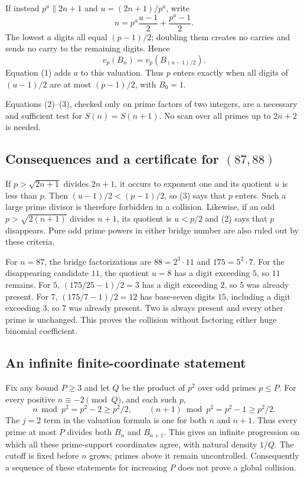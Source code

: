 If instead $p^a\parallel2n+1$ and $u=(2n+1)/p^a$, write
\[
 n=p^a\frac{u-1}{2}+\frac{p^a-1}{2}.
\]
The lowest $a$ digits all equal $(p-1)/2$; doubling them creates no carries and sends no carry to the remaining digits. Hence
\[
 v_p(B_n)=v_p\left(B_{(u-1)/2}\right). \tag{3}
\]
Equation (1) adds $a$ to this valuation. Thus $p$ enters exactly when all digits of $(u-1)/2$ are at most $(p-1)/2$, with $B_0=1$.

Equations (2)--(3), checked only on prime factors of two integers, are a necessary and sufficient test for $S(n)=S(n+1)$. No scan over all primes up to $2n+2$ is needed.

\subsection*{Consequences and a certificate for $(87,88)$}
If $p>\sqrt{2n+1}$ divides $2n+1$, it occurs to exponent one and its quotient $u$ is less than $p$. Then $(u-1)/2<(p-1)/2$, so (3) says that $p$ enters. Such a large prime divisor is therefore forbidden in a collision.
Likewise, if an odd $p>\sqrt{2(n+1)}$ divides $n+1$, its quotient is $u<p/2$ and (2) says that $p$ disappears. Pure odd prime powers in either bridge number are also ruled out by these criteria.

For $n=87$, the bridge factorizations are $88=2^3\cdot11$ and $175=5^2\cdot7$. For the disappearing candidate $11$, the quotient $u=8$ has a digit exceeding $5$, so $11$ remains. For $5$, $(175/25-1)/2=3$ has a digit exceeding $2$, so $5$ was already present. For $7$, $(175/7-1)/2=12$ has base-seven digits $15$, including a digit exceeding $3$, so $7$ was already present. Two is always present and every other prime is unchanged. This proves the collision without factoring either huge binomial coefficient.

\subsection*{An infinite finite-coordinate statement}
Fix any bound $P\geq3$ and let $Q$ be the product of $p^2$ over odd primes $p\leq P$. For every positive $n\equiv-2\pmod Q$, and each such $p$,
\[
 n\bmod p^2=p^2-2\geq p^2/2,\qquad
 (n+1)\bmod p^2=p^2-1\geq p^2/2.
\]
The $j=2$ term in the valuation formula is one for both $n$ and $n+1$. Thus every prime at most $P$ divides both $B_n$ and $B_{n+1}$. This gives an infinite progression on which all these prime-support coordinates agree, with natural density $1/Q$.
The cutoff is fixed before $n$ grows; primes above it remain uncontrolled. Consequently a sequence of these statements for increasing $P$ does not prove a global collision.

